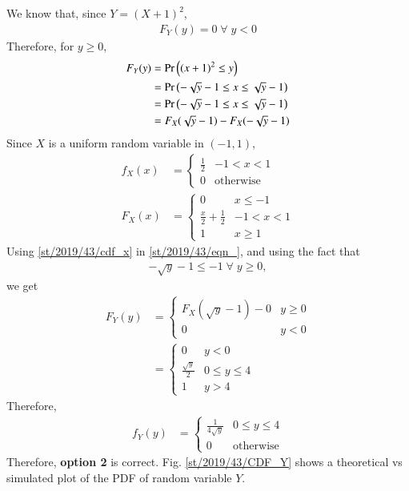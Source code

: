 We know that, since $Y = (X+1)^2$, 
\begin{align}
F_Y(y) = 0 \; \forall \; y < 0
\end{align}
Therefore, for $y\geq 0$, 
\begin{align}
F_Y(y) &= \pr{(x+1)^2 \leq y} \\
&= \pr{-\sqrt{y} - 1 \leq x \leq \sqrt{y} - 1 } \\
&= \pr{-\sqrt{y} - 1 \leq x \leq \sqrt{y} - 1 } \\
&= F_X(\sqrt{y} - 1) - F_X(-\sqrt{y} - 1) 
\label{st/2019/43/eqn_}
\end{align}
Since $X$ is a uniform random variable in $(-1, 1)$,
\begin{align}
f_X(x) &= 
\begin{cases}
\frac{1}{2} & -1 < x < 1 \\
0 & \text{otherwise}
\end{cases}\\
F_X(x) &= 
\begin{cases}
0 & x \leq -1 \\
\frac{x}{2} + \frac{1}{2} & -1 < x < 1 \\
1 & x \geq 1
\end{cases}
\label{st/2019/43/cdf_x}
\end{align}
Using \eqref{st/2019/43/cdf_x} in \eqref{st/2019/43/eqn_}, and using the fact that 
\begin{align}
-\sqrt{y}-1 \leq -1 \; \forall \; y \geq 0,
\end{align}
we get
\begin{align}
F_Y(y) &=  \begin{cases}
F_X(\sqrt{y} - 1) - 0 & y \geq 0\\
0 & y < 0
\end{cases} \\
&= \begin{cases}
0 & y < 0 \\
\frac{\sqrt{y}}{2}  & 0 \leq y \leq 4\\
1 & y > 4
\end{cases}
\end{align}
Therefore, 
\begin{align}
f_Y(y) &= \begin{cases}
\frac{1}{4\sqrt{y}}  & 0 \leq y \leq 4\\
0 & \text{otherwise}
\end{cases}
\end{align}
Therefore, \textbf{option 2} is correct. Fig. \ref{st/2019/43/CDF_Y} shows a theoretical vs simulated plot of the PDF of random variable $Y$.
